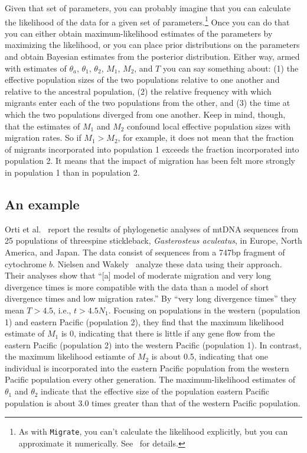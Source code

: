 Given that set of parameters, you can probably imagine that you can
calculate the likelihood of the data for a given set of
parameters.\footnote{As with {\tt Migrate}, you can't calculate the
  likelihood explicitly, but you can approximate it
  numerically. See~\cite{Nielsen-Wakeley-2001} for details.} Once you
can do that you can either obtain maximum-likelihood estimates of the
parameters by maximizing the likelihood, or you can place prior
distributions on the parameters and obtain Bayesian estimates from the
posterior distribution. Either way, armed with estimates of
$\theta_a$, $\theta_1$, $\theta_2$, $M_1$, $M_2$, and $T$ you can say
something about: (1) the effective population sizes of the two
populations relative to one another and relative to the ancestral
population, (2) the relative frequency with which migrants enter each
of the two populations from the other, and (3) the time at which the
two populations diverged from one another. Keep in mind, though, that
the estimates of $M_1$ and $M_2$ confound local effective population
sizes with migration rates. So if $M_1 > M_2$, for example, it does
not mean that the fraction of migrants incorporated into population 1
exceeds the fraction incorporated into population 2. It means that the
impact of migration has been felt more strongly in population 1 than
in population 2.

\subsection*{An example}

Orti et al.~\cite{Orti-etal-1994} report the results of phylogenetic
analyses of mtDNA sequences from 25 populations of threespine
stickleback, {\it Gasterosteus aculeatus}, in Europe, North America,
and Japan. The data consist of sequences from a 747bp fragment of
cytochrome $b$. Nielsen and Wakely~\cite{Nielsen-Wakeley-2001} analyze
these data using their approach. Their analyses show that ``[a] model
of moderate migration and very long divergence times is more
compatible with the data than a model of short divergence times and
low migration rates.'' By ``very long divergence times'' they mean $T
> 4.5$, i.e., $t > 4.5N_1$. Focusing on populations in the western
(population 1) and eastern Pacific (population 2), they find that the
maximum likelihood estimate of $M_1$ is 0, indicating that there is
little if any gene flow from the eastern Pacific (population 2) into
the western Pacific (population 1). In contrast, the maximum
likelihood estiamte of $M_2$ is about 0.5, indicating that one
individual is incorporated into the eastern Pacific population from
the western Pacific population every other generation. The
maximum-likelihood estimates of $\theta_1$ and $\theta_2$ indicate
that the effective size of the population eastern Pacific population
is about 3.0 times greater than that of the western Pacific
population.


